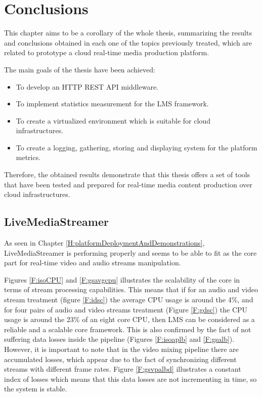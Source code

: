\chapter{Conclusions}\label{C:conclusions}

This chapter aims to be a corollary of the whole thesis, summarizing the results and conclusions obtained in each one of the topics previously treated, which are related to prototype a cloud real-time media production platform.

The main goals of the thesis have been achieved:

\begin{itemize}
\item To develop an HTTP REST API middleware.
\item To implement statistics measurement for the LMS framework.
\item To create a virtualized environment which is suitable for cloud infrastructures.
\item To create a logging, gathering, storing and displaying system for the platform metrics.
\end{itemize}

Therefore, the obtained results demonstrate that this thesis offers a set of tools that have been tested and prepared for real-time media content production over cloud infrastructures.

\section{LiveMediaStreamer}

As seen in Chapter \ref{H:platformDeploymentAndDemonstrations}, LiveMediaStreamer is performing properly and seems to be able to fit as the core part for real-time video and audio streams manipulation.

Figures \ref{F:isoCPU} and \ref{F:gsavgcpu} illustrates the scalability of the core in terms of stream processing capabilities. This means that if for an audio and video stream treatment (figure \ref{F:idsc}) the average CPU usage is around the 4\%, and for four pairs of audio and video streams treatment (Figure \ref{F:gdsc}) the CPU usage is around the 23\% of an eight core CPU, then LMS can be considered as a reliable and a scalable core framework. This is also confirmed by the fact of not suffering data losses inside the pipeline (Figures \ref{F:isoaplb} and \ref{F:gsalb}). However, it is important to note that in the video mixing pipeline there are accumulated losses, which appear due to the fact of synchronizing different streams with different frame rates. Figure \ref{F:gsvpalbd} illustrates a constant index of losses which means that this data losses are not incrementing in time, so the system is stable.

